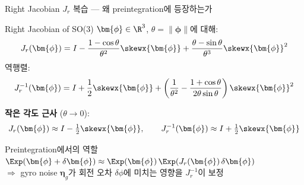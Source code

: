 
\begin{frame}{Right Jacobian $J_r$ 복습 — 왜 preintegration에 등장하는가}

  \begin{block}{Right Jacobian of SO(3)}
    $\bm{\phi} \in \R^3$, $\theta = \|\bm{\phi}\|$에 대해:
    \[
      J_r(\bm{\phi})
      = I
        - \frac{1-\cos\theta}{\theta^2}\skewx{\bm{\phi}}
        + \frac{\theta - \sin\theta}{\theta^3}\skewx{\bm{\phi}}^2
    \]
    역행렬:
    \[
      J_r^{-1}(\bm{\phi})
      = I
        + \frac{1}{2}\skewx{\bm{\phi}}
        + \left(\frac{1}{\theta^2} - \frac{1+\cos\theta}{2\theta\sin\theta}\right)\skewx{\bm{\phi}}^2
    \]
  \end{block}

  \pause
  \textbf{작은 각도 근사} ($\theta \to 0$):
  \[
    J_r(\bm{\phi}) \approx I - \tfrac{1}{2}\skewx{\bm{\phi}},
    \qquad
    J_r^{-1}(\bm{\phi}) \approx I + \tfrac{1}{2}\skewx{\bm{\phi}}
  \]

  \pause
  \begin{exampleblock}{Preintegration에서의 역할}
    $\Exp(\bm{\phi} + \delta\bm{\phi}) \approx \Exp(\bm{\phi})\,\Exp(J_r(\bm{\phi})\,\delta\bm{\phi})$\\
    $\Rightarrow$ gyro noise $\bm{\eta}_g$가 회전 오차 $\delta\phi$에 미치는 영향을 $J_r^{-1}$이 보정
  \end{exampleblock}
\end{frame}

